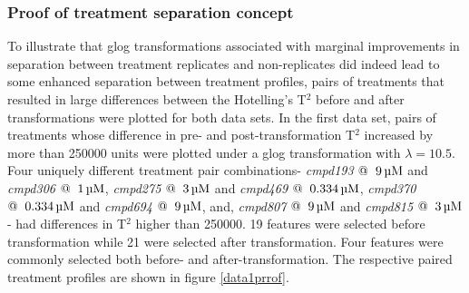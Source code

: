 \documentclass[11pt]{article}
\begin{document}
\subsubsection*{Proof of treatment separation concept}
\par{To illustrate that glog transformations associated with marginal improvements in separation between treatment replicates and non-replicates did indeed lead to some enhanced separation between treatment profiles, pairs of treatments that resulted in large differences between the Hotelling's T$^2$ before and after transformations were plotted for both data sets. In the first data set, pairs of treatments whose difference in pre- and post-transformation T$^2$ increased by more than 250000 units were plotted under a glog transformation with $\lambda = 10.5$. Four uniquely different treatment pair combinations- \textit{cmpd193} $@ \hspace{2mm} \SI{9}{\micro M}$ and \textit{cmpd306} $@ \hspace{2mm} \SI{1}{\micro M}$, \textit{cmpd275} $@ \hspace{2mm} \SI{3}{\micro M}$ and \textit{cmpd469} $@ \hspace{2mm} \SI{0.334}{\micro M}$, \textit{cmpd370} $@ \hspace{2mm} \SI{0.334}{\micro M}$ and \textit{cmpd694} $@ \hspace{2mm} \SI{9}{\micro M}$, and, \textit{cmpd807} $@ \hspace{2mm} \SI{9}{\micro M}$ and \textit{cmpd815} $@ \hspace{2mm} \SI{3}{\micro M}$ - had differences in T$^2$ higher than 250000.  19 features were selected before transformation while 21 were selected after transformation. Four features were commonly selected both before- and after-transformation. The respective paired treatment profiles are shown in figure \ref{data1prrof}.}
\end{document}
